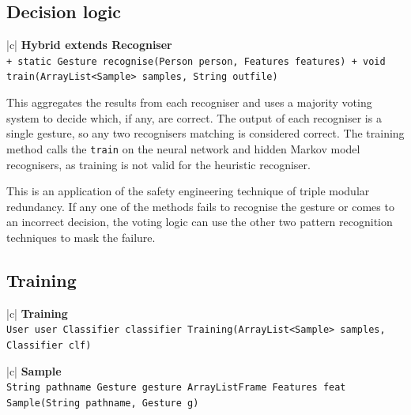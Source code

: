 \documentclass[12pt,a4,notitlepage]{report}
\renewcommand{\_}{\texttt{\symbol{95}}}
\newcommand{\<}{\texttt{\symbol{60}}}
\renewcommand{\>}{\texttt{\symbol{62}}}
\newcommand{\class}[1]{\textbf{#1}}
\newcommand{\variable}[1]{\texttt{#1}}
\begin{document}
\newpage

\subsection{Decision logic}

\begin{tabular}{|c|} \hline 
\class{Hybrid extends Recogniser} \\ \hline
{}
{ \variable{+ static Gesture recognise(Person person, Features features) \newline
+ void train(ArrayList<Sample> samples, String out\_file)
} } \\ \hline
\end{tabular}

This aggregates the results from each recogniser and uses a majority voting system to decide which, if any, are correct. The output of each recogniser is a single gesture, so any two recognisers matching is considered correct. The training method calls the \variable{train} on the neural network and hidden Markov model recognisers, as training is not valid for the heuristic recogniser.

This is an application of the safety engineering technique of triple modular redundancy. If any one of the methods fails to recognise the gesture or comes to an incorrect decision, the voting logic can use the other two pattern recognition techniques to mask the failure.

\subsection{Training}

\begin{tabular}{|c|} \hline 
\class{Training} \\ \hline
{}
{\variable{User user \newline
Classifier classifier \newline
Training(ArrayList<Sample> samples, Classifier clf)
} } \\ \hline
\end{tabular}

\begin{tabular}{|c|} \hline 
\class{Sample} \\ \hline
{}
{\variable{String pathname \newline
Gesture gesture \newline
ArrayList\<Frame\> \newline
Features feat \newline
Sample(String pathname, Gesture g)
} } \\ \hline
\end{tabular}
\end{document}
